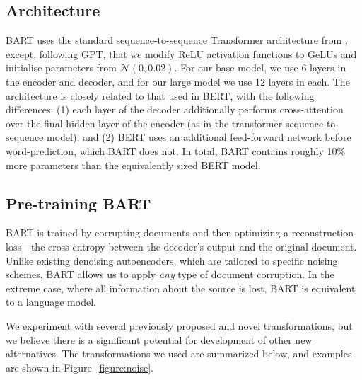 \documentclass{article} %
\newcommand{\omer}[1]{{\color{blue} [Omer: #1]}}
\begin{document}
\subsection{Architecture}
BART uses the standard sequence-to-sequence Transformer architecture from \cite{vaswani:2017}, except, following GPT, that we modify ReLU activation functions to GeLUs \citep{gelu} and initialise parameters from $\mathcal{N}(0, 0.02)$. For our base model, we use 6 layers in the encoder and decoder, and for our large model we use 12 layers in each. The architecture is closely related to that used in BERT, with the following differences: (1) each layer of the decoder additionally performs cross-attention over the final hidden layer of the encoder (as in the transformer sequence-to-sequence model); and (2) BERT uses an additional feed-forward network before word-prediction, which BART does not. In total, BART contains roughly 10\% more parameters than the equivalently sized BERT model. 

\subsection{Pre-training BART}
BART is trained by corrupting documents and then optimizing a reconstruction loss---the cross-entropy between the decoder's output and the original document. Unlike existing denoising autoencoders, which are tailored to specific noising schemes, BART allows us to apply \emph{any} type of document corruption.
In the extreme case, where all information about the source is lost, BART is equivalent to a language model.

We experiment with several previously proposed and novel transformations, but we believe there is a significant potential for development of other new alternatives. The transformations we used are summarized below, and examples are shown in Figure~\ref{figure:noise}.
\end{document}
